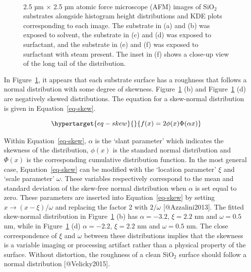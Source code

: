 \documentclass[
  letterpaper,
  DIV=11,
  numbers=noendperiod]{scrartcl}
\begin{document}
\begin{figure}
\begin{minipage}[t]{0.45\linewidth}
{{}

}

\end{minipage}%
%
\begin{minipage}[t]{0.01\linewidth}

{\centering 

~

}

\end{minipage}%

\caption{\label{fig-afm-substrate}2.5 µm \(\times\) 2.5 µm atomic force
microscope (AFM) images of SiO\(_2\) substrates alongside histogram
height distributions and KDE plots corresponding to each image. The
substrate in (a) and (b) was exposed to solvent, the substrate in (c)
and (d) was exposed to surfactant, and the substrate in (e) and (f) was
exposed to surfactant with steam present. The inset in (f) shows a
close-up view of the long tail of the distribution.}

\end{figure}

In Figure~\ref{fig-afm-substrate}, it appears that each substrate
surface has a roughness that follows a normal distribution with some
degree of skewness. Figure~\ref{fig-afm-substrate} (b) and
Figure~\ref{fig-afm-substrate} (d) are negatively skewed distributions.
The equation for a skew-normal distribution is given in
Equation~\ref{eq-skew}.

\begin{equation}\protect\hypertarget{eq-skew}{}{
f(x) = 2\phi(x)\Phi(\alpha x)
}\label{eq-skew}\end{equation}

Within Equation~\ref{eq-skew}, \(\alpha\) is the `slant parameter' which
indicates the skewness of the distribution, \(\phi(x)\) is the standard
normal distribution and \(\Phi(x)\) is the corresponding cumulative
distribution function. In the most general case, Equation~\ref{eq-skew}
can be modified with the `location parameter' \(\xi\) and `scale
parameter' \(\omega\). These variables respectively correspond to the
mean and standard deviation of the skew-free normal distribution when
\(\alpha\) is set equal to zero. These parameters are inserted into
Equation~\ref{eq-skew} by setting \(x \rightarrow (x-\xi)/\omega\) and
replacing the factor 2 with \(2/\omega\) {[}@Azzalini2013{]}. The fitted
skew-normal distribution in Figure~\ref{fig-afm-substrate} (b) has
\(\alpha = -3.2\), \(\xi = 2.2\) nm and \(\omega = 0.5\) nm, while in
Figure~\ref{fig-afm-substrate} (d) \(\alpha = -2.2\), \(\xi = 2.2\) nm
and \(\omega = 0.5\) nm. The close correspondence of \(\xi\) and
\(\omega\) between these distributions implies that the skewness is a
variable imaging or processing artifact rather than a physical property
of the surface. Without distortion, the roughness of a clean SiO\(_2\)
surface should follow a normal distribution {[}@Velicky2015{]}.
\end{document}
